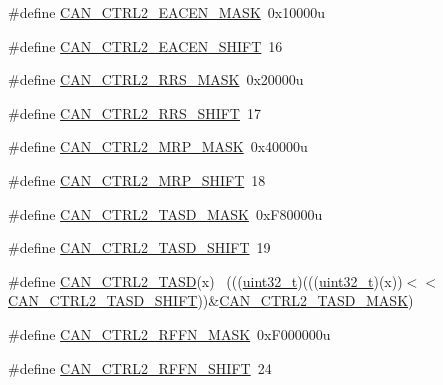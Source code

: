 \begin{DoxyCompactItemize}
\item 
\#define \hyperlink{group___c_a_n___register___masks_gacf49e8d44f1f8993cda6e29a36c7a90f}{C\+A\+N\+\_\+\+C\+T\+R\+L2\+\_\+\+E\+A\+C\+E\+N\+\_\+\+M\+A\+SK}~0x10000u
\item 
\#define \hyperlink{group___c_a_n___register___masks_gae0e425b33b8b975d6a33b8e090e040e8}{C\+A\+N\+\_\+\+C\+T\+R\+L2\+\_\+\+E\+A\+C\+E\+N\+\_\+\+S\+H\+I\+FT}~16
\item 
\#define \hyperlink{group___c_a_n___register___masks_ga5776a65b75ea42afc810081a66d4e1b4}{C\+A\+N\+\_\+\+C\+T\+R\+L2\+\_\+\+R\+R\+S\+\_\+\+M\+A\+SK}~0x20000u
\item 
\#define \hyperlink{group___c_a_n___register___masks_ga143cc0bdd4c88978ccbe42849d3fc038}{C\+A\+N\+\_\+\+C\+T\+R\+L2\+\_\+\+R\+R\+S\+\_\+\+S\+H\+I\+FT}~17
\item 
\#define \hyperlink{group___c_a_n___register___masks_ga7f07676c379363d679cfcb6c362e1cc6}{C\+A\+N\+\_\+\+C\+T\+R\+L2\+\_\+\+M\+R\+P\+\_\+\+M\+A\+SK}~0x40000u
\item 
\#define \hyperlink{group___c_a_n___register___masks_ga868c342244c921f9824c4d0c172f4081}{C\+A\+N\+\_\+\+C\+T\+R\+L2\+\_\+\+M\+R\+P\+\_\+\+S\+H\+I\+FT}~18
\item 
\#define \hyperlink{group___c_a_n___register___masks_ga50bd2b3ca86be2357515614d717e8167}{C\+A\+N\+\_\+\+C\+T\+R\+L2\+\_\+\+T\+A\+S\+D\+\_\+\+M\+A\+SK}~0x\+F80000u
\item 
\#define \hyperlink{group___c_a_n___register___masks_gac9265ea7ee9b07803fdb62c92aa85ea0}{C\+A\+N\+\_\+\+C\+T\+R\+L2\+\_\+\+T\+A\+S\+D\+\_\+\+S\+H\+I\+FT}~19
\item 
\#define \hyperlink{group___c_a_n___register___masks_ga6fa49bff7c2059e6da16b4442e09814e}{C\+A\+N\+\_\+\+C\+T\+R\+L2\+\_\+\+T\+A\+SD}(x)                                            ~(((\hyperlink{_p_e___types_8h_a33594304e786b158f3fb30289278f5af}{uint32\+\_\+t})(((\hyperlink{_p_e___types_8h_a33594304e786b158f3fb30289278f5af}{uint32\+\_\+t})(x))$<$$<$\hyperlink{group___c_a_n___register___masks_gac9265ea7ee9b07803fdb62c92aa85ea0}{C\+A\+N\+\_\+\+C\+T\+R\+L2\+\_\+\+T\+A\+S\+D\+\_\+\+S\+H\+I\+FT}))\&\hyperlink{group___c_a_n___register___masks_ga50bd2b3ca86be2357515614d717e8167}{C\+A\+N\+\_\+\+C\+T\+R\+L2\+\_\+\+T\+A\+S\+D\+\_\+\+M\+A\+SK})
\item 
\#define \hyperlink{group___c_a_n___register___masks_ga2cf8e472f27dccf6b1e9b9af80f76542}{C\+A\+N\+\_\+\+C\+T\+R\+L2\+\_\+\+R\+F\+F\+N\+\_\+\+M\+A\+SK}~0x\+F000000u
\item 
\#define \hyperlink{group___c_a_n___register___masks_ga573803e007b6904ec3b8c5ab45acf33e}{C\+A\+N\+\_\+\+C\+T\+R\+L2\+\_\+\+R\+F\+F\+N\+\_\+\+S\+H\+I\+FT}~24
$$
\end{DoxyCompactItemize}
